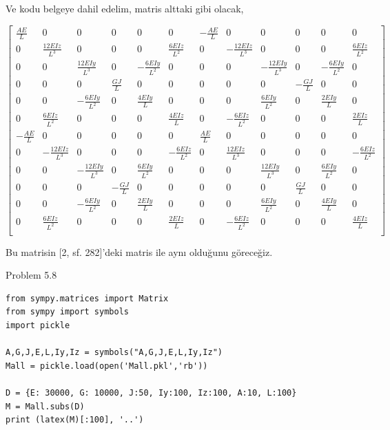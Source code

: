 \documentclass[12pt,fleqn]{article}\usepackage{../../common}
\begin{document}
Ve kodu belgeye dahil edelim, matris alttaki gibi olacak,

$$
\left[\begin{array}{cccccccccccc}
\frac{A E}{L} & 0 & 0 & 0 & 0 & 0 & - \frac{A E}{L} & 0 & 0 & 0 & 0 & 0\\
0 & \frac{12 E Iz}{L^{3}} & 0 & 0 & 0 & \frac{6 E Iz}{L^{2}} & 0 & - \frac{12 E Iz}{L^{3}} & 0 & 0 & 0 & \frac{6 E Iz}{L^{2}}\\
0 & 0 & \frac{12 E Iy}{L^{3}} & 0 & - \frac{6 E Iy}{L^{2}} & 0 & 0 & 0 & - \frac{12 E Iy}{L^{3}} & 0 & - \frac{6 E Iy}{L^{2}} & 0\\
0 & 0 & 0 & \frac{G J}{L} & 0 & 0 & 0 & 0 & 0 & - \frac{G J}{L} & 0 & 0\\
0 & 0 & - \frac{6 E Iy}{L^{2}} & 0 & \frac{4 E Iy}{L} & 0 & 0 & 0 & \frac{6 E Iy}{L^{2}} & 0 & \frac{2 E Iy}{L} & 0\\
0 & \frac{6 E Iz}{L^{2}} & 0 & 0 & 0 & \frac{4 E Iz}{L} & 0 & - \frac{6 E Iz}{L^{2}} & 0 & 0 & 0 & \frac{2 E Iz}{L}\\
- \frac{A E}{L} & 0 & 0 & 0 & 0 & 0 & \frac{A E}{L} & 0 & 0 & 0 & 0 & 0\\
0 & - \frac{12 E Iz}{L^{3}} & 0 & 0 & 0 & - \frac{6 E Iz}{L^{2}} & 0 & \frac{12 E Iz}{L^{3}} & 0 & 0 & 0 & - \frac{6 E Iz}{L^{2}}\\
0 & 0 & - \frac{12 E Iy}{L^{3}} & 0 & \frac{6 E Iy}{L^{2}} & 0 & 0 & 0 & \frac{12 E Iy}{L^{3}} & 0 & \frac{6 E Iy}{L^{2}} & 0\\
0 & 0 & 0 & - \frac{G J}{L} & 0 & 0 & 0 & 0 & 0 & \frac{G J}{L} & 0 & 0\\
0 & 0 & - \frac{6 E Iy}{L^{2}} & 0 & \frac{2 E Iy}{L} & 0 & 0 & 0 & \frac{6 E Iy}{L^{2}} & 0 & \frac{4 E Iy}{L} & 0\\
0 & \frac{6 E Iz}{L^{2}} & 0 & 0 & 0 & \frac{2 E Iz}{L} & 0 & - \frac{6 E Iz}{L^{2}} & 0 & 0 & 0 & \frac{4 E Iz}{L}\\
\end{array}\right]
$$

Bu matrisin [2, sf. 282]'deki matris ile aynı olduğunu göreceğiz.

Problem 5.8

\begin{verbatim}
from sympy.matrices import Matrix
from sympy import symbols
import pickle

A,G,J,E,L,Iy,Iz = symbols("A,G,J,E,L,Iy,Iz")
Mall = pickle.load(open('Mall.pkl','rb'))

D = {E: 30000, G: 10000, J:50, Iy:100, Iz:100, A:10, L:100}
M = Mall.subs(D)
print (latex(M)[:100], '..')
\end{verbatim}
\end{document}
